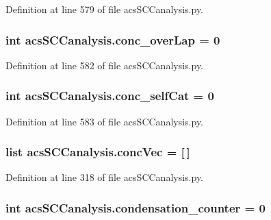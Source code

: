 Definition at line 579 of file acs\-S\-C\-Canalysis.\-py.

\hypertarget{a00096_afd3169174539244248b78c8da2bba265}{
\subsubsection[{conc\-\_\-over\-Lap}]{\setlength{\rightskip}{0pt plus 5cm}int acs\-S\-C\-Canalysis.\-conc\-\_\-over\-Lap = 0}}\label{a00096_afd3169174539244248b78c8da2bba265}


Definition at line 582 of file acs\-S\-C\-Canalysis.\-py.

\hypertarget{a00096_a9e8cc07f7d7f892f3f72274318dcbcef}{
\subsubsection[{conc\-\_\-self\-Cat}]{\setlength{\rightskip}{0pt plus 5cm}int acs\-S\-C\-Canalysis.\-conc\-\_\-self\-Cat = 0}}\label{a00096_a9e8cc07f7d7f892f3f72274318dcbcef}


Definition at line 583 of file acs\-S\-C\-Canalysis.\-py.

\hypertarget{a00096_a1681853ab5f5859e51f219caa07a8539}{
\subsubsection[{conc\-Vec}]{\setlength{\rightskip}{0pt plus 5cm}list acs\-S\-C\-Canalysis.\-conc\-Vec = \mbox{[}$\,$\mbox{]}}}\label{a00096_a1681853ab5f5859e51f219caa07a8539}


Definition at line 318 of file acs\-S\-C\-Canalysis.\-py.

\hypertarget{a00096_a144441bdbe6e835849cf165ea2946848}{
\subsubsection[{condensation\-\_\-counter}]{\setlength{\rightskip}{0pt plus 5cm}int acs\-S\-C\-Canalysis.\-condensation\-\_\-counter = 0}}\label{a00096_a144441bdbe6e835849cf165ea2946848}


